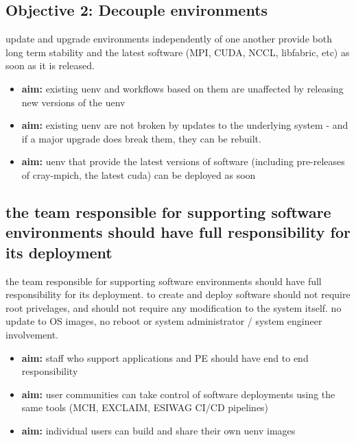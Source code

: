 \subsection{Objective 2: Decouple environments}

update and upgrade environments independently of one another
provide both long term stability and the latest software (MPI, CUDA, NCCL, libfabric, etc) as soon as it is released.

\begin{itemize}
    \item \textbf{aim:} existing uenv and workflows based on them are unaffected by releasing new versions of the uenv
    \item \textbf{aim:} existing uenv are not broken by updates to the underlying system - and if a major upgrade does break them, they can be rebuilt.
    \item \textbf{aim:} uenv that provide the latest versions of software (including pre-releases of cray-mpich, the latest cuda) can be deployed as soon
\end{itemize}

\subsection{the team responsible for supporting software environments should have full responsibility for its deployment}

the team responsible for supporting software environments should have full responsibility for its deployment.
to create and deploy software should not require root privelages, and should not require any modification to the system itself.
no update to OS images, no reboot or system administrator / system engineer involvement.

\begin{itemize}
    \item \textbf{aim:} staff who support applications and PE should have end to end responsibility
    \item \textbf{aim:} user communities can take control of software deployments using the same tools (MCH, EXCLAIM, ESIWAG CI/CD pipelines)
    \item \textbf{aim:} individual users can build and share their own uenv images
\end{itemize}
